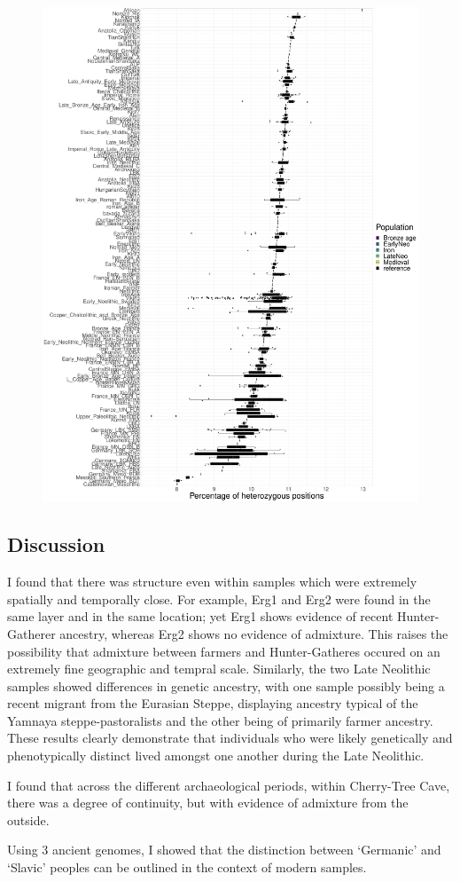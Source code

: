 \begin{figure}[htp]
    \centering
    \includegraphics[width=1.0\textwidth]{../images/chapter4/het_per_pop.pdf}
    \caption{}
    \label{fig:het_per_pop}
\end{figure}

\subsection{Discussion}

I found that there was structure even within samples which were extremely spatially and temporally close. For example, Erg1 and Erg2 were found in the same layer and in the same location; yet Erg1 shows evidence of recent Hunter-Gatherer ancestry, whereas Erg2 shows no evidence of admixture. This raises the possibility that admixture between farmers and Hunter-Gatheres occured on an extremely fine geographic and tempral scale. Similarly, the two Late Neolithic samples showed differences in genetic ancestry, with one sample possibly being a recent migrant from the Eurasian Steppe, displaying ancestry typical of the Yamnaya steppe-pastoralists and the other being of primarily farmer ancestry. These results clearly demonstrate that individuals who were likely genetically and phenotypically distinct lived amongst one another during the Late Neolithic. 

I found that across the different archaeological periods, within Cherry-Tree Cave, there was a degree of continuity, but with evidence of admixture from the outside. 

Using 3 ancient genomes, I showed that the distinction between `Germanic' and `Slavic' peoples can be outlined in the context of modern samples.